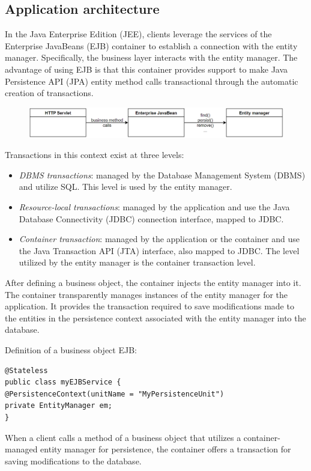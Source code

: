 \subsection{Application architecture}
In the Java Enterprise Edition (JEE), clients leverage the services of the Enterprise JavaBeans (EJB) container to establish a connection with the entity manager.
Specifically, the business layer interacts with the entity manager.
The advantage of using EJB is that this container provides support to make Java Persistence API (JPA) entity method calls transactional through the automatic creation of transactions.
\begin{figure}[H]
    \centering
    \includegraphics[width=0.75\linewidth]{images/jee1.png}
\end{figure}
Transactions in this context exist at three levels:
\begin{itemize}
    \item \textit{DBMS transactions}: managed by the Database Management System (DBMS) and utilize SQL.
        This level is used by the entity manager.
    \item \textit{Resource-local transactions}: managed by the application and use the Java Database Connectivity (JDBC) connection interface, mapped to JDBC.
    \item \textit{Container transaction}: managed by the application or the container and use the Java Transaction API (JTA) interface, also mapped to JDBC. 
        The level utilized by the entity manager is the container transaction level.
\end{itemize}
After defining a business object, the container injects the entity manager into it.
The container transparently manages instances of the entity manager for the application.
It provides the transaction required to save modifications made to the entities in the persistence context associated with the entity manager into the database.
\begin{example}
    Definition of a business object EJB: 
    \begin{lstlisting}[style=Java]
@Stateless 
public class myEJBService {
@PersistenceContext(unitName = "MyPersistenceUnit")
private EntityManager em; 
}
    \end{lstlisting}
\end{example}
When a client calls a method of a business object that utilizes a container-managed entity manager for persistence, the container offers a transaction for saving modifications to the database.
